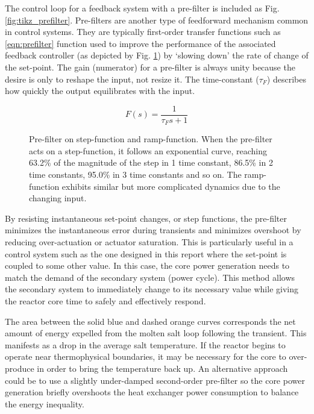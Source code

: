 The control loop for a feedback system with a pre-filter is included as Fig. \ref{fig:tikz_prefilter}. Pre-filters are another type of feedforward mechanism common in control systems. They are typically first-order transfer functions such as \ref{eqn:prefilter} function used to improve the performance of the associated feedback controller (as depicted by Fig. \ref{fig:pgf_prefilter}) by `slowing down' the rate of change of the set-point. The gain (numerator) for a pre-filter is always unity because the desire is only to reshape the input, not resize it. The time-constant ($\tau_F$) describes how quickly the output equilibrates with the input. 

\begin{equation}\label{eqn:prefilter}
    F(s)=\frac{1}{\tau_F s+1}    
\end{equation}

\begin{figure}[!ht]
    \centering
    \qquad
    \caption[Pre-filter on (a) step-function and (b) ramp-function]{Pre-filter on step-function and ramp-function. When the pre-filter acts on a step-function, it follows an exponential curve, reaching 63.2\% of the magnitude of the step in 1 time constant, 86.5\% in 2 time constants, 95.0\% in 3 time constants and so on. The ramp-function exhibits similar but more complicated dynamics due to the changing input.}
    \label{fig:pgf_prefilter}
\end{figure}

By resisting instantaneous set-point changes, or step functions, the pre-filter minimizes the instantaneous error during transients and minimizes overshoot by reducing over-actuation or actuator saturation.  This is particularly useful in a control system such as the one designed in this report where the set-point is coupled to some other value. In this case, the core power generation needs to match the demand of the secondary system (\eg power cycle). This method allows the secondary system to immediately change to its necessary value while giving the reactor core time to safely and effectively respond. 

The area between the solid blue and dashed orange curves corresponds the net amount of energy expelled from the molten salt loop following the transient. This manifests as a drop in the average salt temperature. If the reactor begins to operate near thermophysical boundaries, it may be necessary for the core to over-produce in order to bring the temperature back up. An alternative approach could be to use a slightly under-damped second-order pre-filter so the core power generation briefly overshoots the heat exchanger power consumption to balance the energy inequality.


